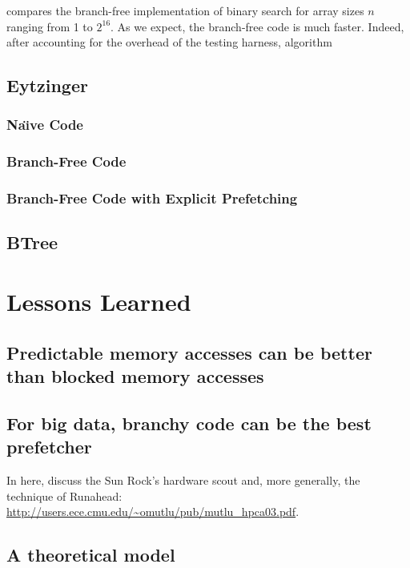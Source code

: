 \documentclass{patmorin}
\begin{document}
 compares the branch-free implementation of binary search for array sizes $n$ ranging from 1 to $2^{16}$.  As we expect, the branch-free code is much faster. Indeed, after accounting for the overhead of the testing harness, algorithm 





\subsection{Eytzinger}

\subsubsection{Na\"{\i}ve Code}

\subsubsection{Branch-Free Code}

\subsubsection{Branch-Free Code with Explicit Prefetching}

\subsection{BTree}


\section{Lessons Learned}

\subsection{Predictable memory accesses can be better than blocked
            memory accesses}

\subsection{For big data, branchy code can be the best prefetcher}

In here, discuss the Sun Rock's hardware scout and, more generally, the technique of Runahead: \url{http://users.ece.cmu.edu/~omutlu/pub/mutlu_hpca03.pdf}.

\subsection{A theoretical model}
\end{document}
